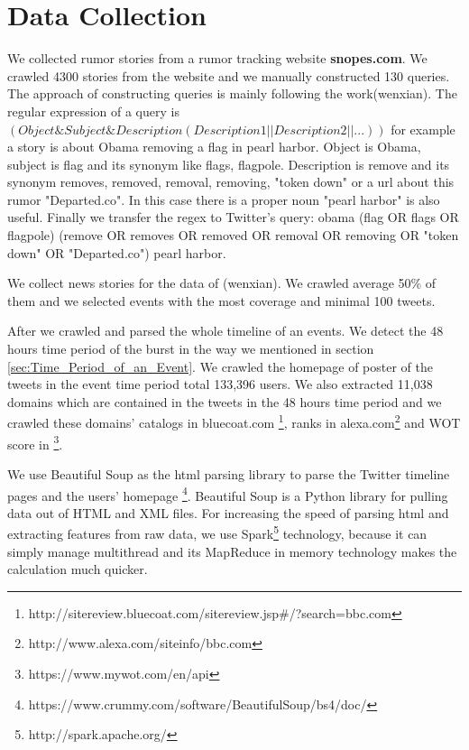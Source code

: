 \chapter{Data Collection} %
\label{cha:Data_Collection}
We collected rumor stories from a rumor tracking website \textbf{snopes.com}. We crawled 4300 stories from the website and we manually constructed 130 queries. The approach of constructing queries is mainly following the work(wenxian). The regular expression of a query is $(Object \& Subject \& Description(Description1||Description2||...))$
for example a story is about Obama removing a flag in pearl harbor. Object is Obama, subject is flag and its synonym like flags, flagpole. Description is remove and its synonym removes, removed, removal, removing, "token down" or a url about this rumor "Departed.co". In this case there is a proper noun "pearl harbor" is also useful. Finally we transfer the regex to Twitter's query: obama (flag OR flags OR flagpole) (remove OR removes OR removed OR removal OR removing OR "token down" OR "Departed.co") pearl harbor.



We collect news stories for the data of (wenxian). We crawled average 50\% of them and we selected events with the most coverage and minimal 100 tweets. 

After we crawled and parsed the whole timeline of an events. We detect the 48 hours time period of the burst in the way we mentioned in section \ref{sec:Time_Period_of_an_Event}. We crawled the homepage of poster of the tweets in the event time period total 133,396 users. We also extracted 11,038 domains which are contained in the tweets in the 48 hours time period and we crawled these domains' catalogs in bluecoat.com \footnote{http://sitereview.bluecoat.com/sitereview.jsp\#/?search=bbc.com}, ranks in alexa.com\footnote{http://www.alexa.com/siteinfo/bbc.com} and WOT score in \footnote{https://www.mywot.com/en/api}. 

We use Beautiful Soup as the html parsing library to parse the Twitter timeline pages and the users' homepage \footnote{https://www.crummy.com/software/BeautifulSoup/bs4/doc/}. Beautiful Soup is a Python library for pulling data out of HTML and XML files. For increasing the speed of parsing html and extracting features from raw data, we use Spark\footnote{http://spark.apache.org/} technology, because it can simply manage multithread and its MapReduce in memory technology makes the calculation much quicker.  

